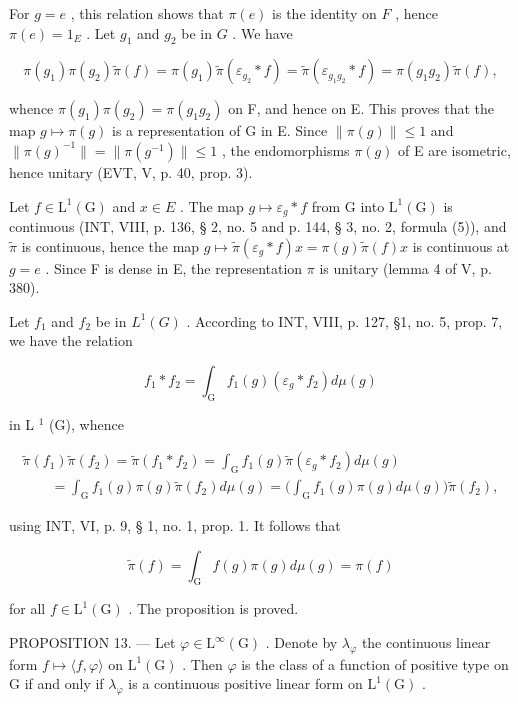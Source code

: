 For \(g = e\) , this relation shows that \(\pi(e)\) is the identity on \(F\) , hence \(\pi(e) = 1_{E}\) . Let \(g_1\) and \(g_2\) be in \(G\) . We have

\[
\pi (g _ {1}) \pi (g _ {2}) \widetilde {\pi} (f) = \pi (g _ {1}) \widetilde {\pi} (\varepsilon_ {g _ {2}} * f) = \widetilde {\pi} (\varepsilon_ {g _ {1} g _ {2}} * f) = \pi (g _ {1} g _ {2}) \widetilde {\pi} (f),
\]

whence \(\pi(g_1)\pi(g_2) = \pi(g_1g_2)\) on F, and hence on E. This proves that the map \(g \mapsto \pi(g)\) is a representation of G in E. Since \(\|\pi(g)\| \leqslant 1\) and \(\|\pi(g)^{-1}\| = \|\pi(g^{-1})\| \leqslant 1\) , the endomorphisms \(\pi(g)\) of E are isometric, hence unitary (EVT, V, p. 40, prop. 3).

Let \(f \in \mathrm{L}^{1}(\mathrm{G})\) and \(x \in E\) . The map \(g \mapsto \varepsilon_{g} * f\) from G into \(\mathrm{L}^{1}(\mathrm{G})\) is continuous (INT, VIII, p. 136, § 2, no. 5 and p. 144, § 3, no. 2, formula (5)), and \(\widetilde{\pi}\) is continuous, hence the map \(g \mapsto \widetilde{\pi}(\varepsilon_{g} * f)x = \pi(g)\widetilde{\pi}(f)x\) is continuous at \(g = e\) . Since F is dense in E, the representation \(\pi\) is unitary (lemma 4 of V, p. 380).

Let \(f_1\) and \(f_2\) be in \(L^1(G)\) . According to INT, VIII, p. 127, §1, no. 5, prop. 7, we have the relation

\[
f _ {1} * f _ {2} = \int_ {\mathrm{G}} f _ {1} (g) (\varepsilon_ {g} * f _ {2}) d \mu (g)
\]

in L \(^{1}\) (G), whence

\[
\begin{array}{l} \widetilde {\pi} (f _ {1}) \widetilde {\pi} (f _ {2}) = \widetilde {\pi} (f _ {1} * f _ {2}) = \int_ {\mathrm{G}} f _ {1} (g) \widetilde {\pi} (\varepsilon_ {g} * f _ {2}) d \mu (g) \\ \qquad = \int_ {\mathrm{G}} f _ {1} (g) \pi (g) \widetilde {\pi} (f _ {2}) d \mu (g) = \Big (\int_ {\mathrm{G}} f _ {1} (g) \pi (g) d \mu (g) \Big) \widetilde {\pi} (f _ {2}), \end{array}
\]

using INT, VI, p. 9, § 1, no. 1, prop. 1. It follows that

\[
\widetilde {\pi} (f) = \int_ {\mathrm{G}} f (g) \pi (g) d \mu (g) = \pi (f)
\]

for all \(f \in \mathrm{L}^{1}(\mathrm{G})\) . The proposition is proved.

PROPOSITION 13. --- Let \(\varphi\in\mathrm{L}^{\infty}(\mathrm{G})\) . Denote by \(\lambda_{\varphi}\) the continuous linear form \(f\mapsto\langle f,\varphi\rangle\) on \(\mathrm{L}^{1}(\mathrm{G})\) . Then \(\varphi\) is the class of a function of positive type on G if and only if \(\lambda_{\varphi}\) is a continuous positive linear form on \(\mathrm{L}^{1}(\mathrm{G})\) .

